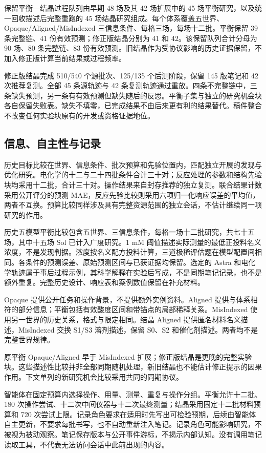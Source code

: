 \documentclass[10pt,a4paper]{article}
\begin{document}
保留平衡---结晶过程队列由早期 48 场及其 42 场扩展中的 45 场平衡研究，以及统一回收描述后完整重跑的 45 场结晶研究组成。每个体系覆盖五世界、Opaque/Aligned/MisIndexed 三信息条件、每格三场，每场十二批。平衡保留 39 条完整链、41 份有效预测；修正版结晶分别为 41 和 42。该保留队列合计分母为 90 场、80 条完整链、83 份有效预测。旧结晶作为受协议影响的历史证据保留，不加入修正版计算当前结果或过程频率。

修正版结晶完成 510/540 个源批次、125/135 个后测阶段，保留 145 版笔记和 42 次推荐复测。全部 45 条源轨迹与 42 条复测轨迹通过重放。四条不完整链中，三条缺失预测，另一条有有效预测但缺失随后的反思。平衡子集与独立的研究机会块各自保留失败表。缺失不填零，已完成结果不由后来更有利的结果替代。稿件整合不改变任何实验块原有的开发或资格证据地位。

\subsection{信息、自主性与记录}\label{ux4fe1ux606fux81eaux4e3bux6027ux4e0eux8bb0ux5f55}

历史目标比较在世界、信息条件、批次预算和先验位置内，匹配独立开展的发现与优化研究。电化学的十二与二十四批条件合计三十对；反应处理的参数和结构先验块均采用十二批，合计三十对。操作结果来自封存推荐的独立复测。联合结果计数采用公开评分的预测 MAE，反应先验比较则采用六项归一化响应误差的平均值，两者不互换。预算比较同样涉及具有完整资源范围的独立会话，不估计继续同一项研究的作用。

历史五模型平衡比较包含五世界、三信息条件，每格一场十二批研究，共七十五场，其中十五场 Sol 已计入广度研究。1 mM 阈值描述实际测量的最低正投料名义浓度，不是发现判据。浓度按名义配方投料计算，三道极稀评估题在模型配置间相同。各条件的预测误差、原始预测区间与已获证据均保留。选定的 Astra 和电化学轨迹属于事后过程示例，其科学解释在实验后写成，不是同期笔记记录，也不是额外重复。完整历史设计、响应表和案例数值保留在补充材料。

Opaque 提供公开任务和操作背景，不提供额外实例资料。Aligned 提供与体系相符的部分信息；平衡包括有效酸度区间和带锚点的局部稀释关系。MisIndexed 使用另一世界的历史关系，格式与限定相同。结晶 Aligned 提供匿名材料名义描述，MisIndexed 交换 S1/S3 溶剂描述，保留 S0、S2 和催化剂描述。两者均不是完整世界规律。

原平衡 Opaque/Aligned 早于 MisIndexed 扩展；修正版结晶是更晚的完整实验块。这些描述性比较并非全部同期随机处理，新旧结晶也不能估计修正提示的因果作用。下文单列的新研究机会比较采用共同的同期协议。

智能体在固定预算内选择操作、用量、测量、重复与操作分组。平衡允许十二批、180 次操作尝试、十二次中间仪器与十二次最终测量；结晶采用固定十二批材料预算和 720 次尝试上限。记录角色要求在适用时先写出可检验预期，后续由智能体自主更新，不要求每批书写，也不自动重新注入笔记。记录角色可能影响研究，不被视为被动观察。笔记保存版本与公开事件游标，不揭示内部认知。没有调用笔记读取工具，不代表无法访问会话中此前出现的内容。
\end{document}
